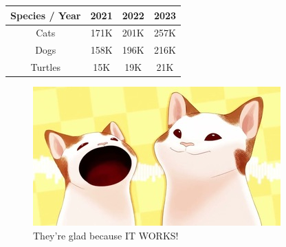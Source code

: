 \documentclass{article}
\begin{document}
\begin{tabular}{|c|c|c|c|}
\hline
Species / Year & 2021 & 2022 & 2023 \\
\hline
Cats & 171K & 201K & 257K \\
\hline
Dogs & 158K & 196K & 216K \\
\hline
Turtles & 15K & 19K & 21K \\
\hline
\end{tabular}
\begin{figure}[h!]
\centering
\includegraphics{test_image.jpg}
\caption{They're glad because IT WORKS!}
\label{glad_cats}
\end{figure}
\end{document}
